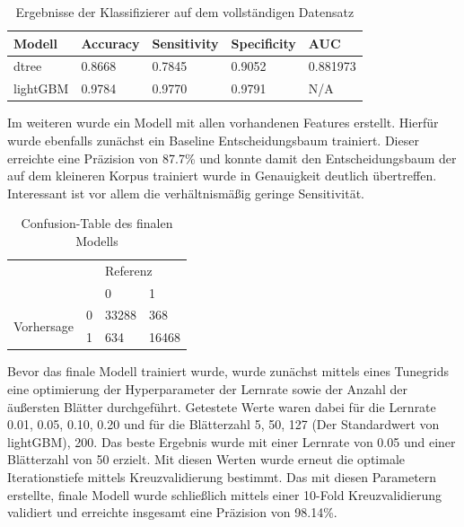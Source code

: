 \begin{table}
    \begin{center}
        \begin{tabularx}{\textwidth}{XXXXX}
            \toprule
            Modell & Accuracy & Sensitivity & Specificity & AUC\\
            \midrule
            dtree & 0.8668 & 0.7845 & 0.9052 & 0.881973 \\
            lightGBM\footnotemark & 0.9784 & 0.9770 & 0.9791 & N/A \\
            \bottomrule
        \end{tabularx}
        \caption{Ergebnisse der Klassifizierer auf dem vollständigen Datensatz}
        \label{full-model}
    \end{center}
\end{table}


Im weiteren wurde ein Modell mit allen vorhandenen Features erstellt.
Hierfür wurde ebenfalls zunächst ein Baseline Entscheidungsbaum trainiert.
Dieser erreichte eine Präzision von 87.7\% und konnte damit den Entscheidungsbaum der auf dem kleineren Korpus trainiert wurde in Genauigkeit deutlich übertreffen.
Interessant ist vor allem die verhältnismäßig geringe Sensitivität.

\begin{table}
    \begin{center}
        \begin{tabularx}{\textwidth}{XXXX}
            \toprule
            & & \multicolumn{2}{X}{Referenz}\\
            & & 0 & 1 \\
            \multirow{2}{*}{Vorhersage} & 0 & 33288 & 368 \\
            & 1 & 634 & 16468 \\\midrule
        \end{tabularx}
        \caption{Confusion-Table des finalen Modells}
        \label{confusion-table}
    \end{center}
\end{table}

Bevor das finale Modell trainiert wurde, wurde zunächst mittels eines Tunegrids eine optimierung der Hyperparameter der Lernrate sowie der Anzahl der äußersten Blätter durchgeführt.
Getestete Werte waren dabei für die Lernrate 0.01, 0.05, 0.10, 0.20 und für die Blätterzahl 5, 50, 127 (Der Standardwert von lightGBM), 200.
Das beste Ergebnis wurde mit einer Lernrate von 0.05 und einer Blätterzahl von 50 erzielt.
Mit diesen Werten wurde erneut die optimale Iterationstiefe mittels Kreuzvalidierung bestimmt.
Das mit diesen Parametern erstellte, finale Modell wurde schließlich mittels einer 10-Fold Kreuzvalidierung validiert und erreichte insgesamt eine Präzision von 98.14\%.

